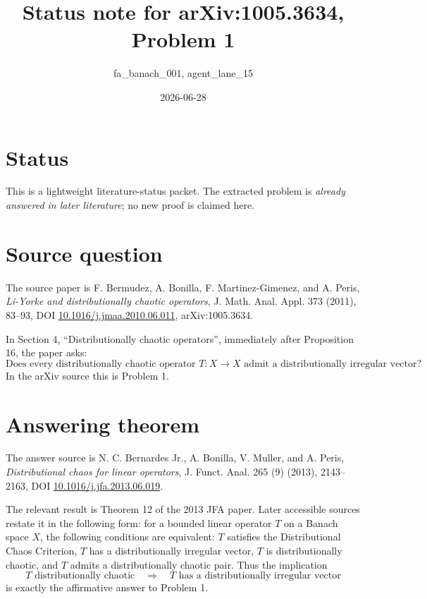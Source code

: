 \documentclass[11pt]{article}
\title{Status note for arXiv:1005.3634, Problem 1}
\author{fa\_banach\_001, agent\_lane\_15}
\date{2026-06-28}
\begin{document}
\maketitle

\section*{Status}

This is a lightweight literature-status packet.  The extracted problem is
\emph{already answered in later literature}; no new proof is claimed here.

\section*{Source question}

The source paper is F. Bermudez, A. Bonilla, F. Martinez-Gimenez, and A. Peris,
\emph{Li-Yorke and distributionally chaotic operators}, J. Math. Anal. Appl.
373 (2011), 83--93, DOI
\href{https://doi.org/10.1016/j.jmaa.2010.06.011}{10.1016/j.jmaa.2010.06.011},
arXiv:1005.3634.

In Section 4, ``Distributionally chaotic operators'', immediately after
Proposition 16, the paper asks:
\[
\text{Does every distributionally chaotic operator } T:X\to X
\text{ admit a distributionally irregular vector?}
\]
In the arXiv source this is Problem 1.

\section*{Answering theorem}

The answer source is N. C. Bernardes Jr., A. Bonilla, V. Muller, and A. Peris,
\emph{Distributional chaos for linear operators}, J. Funct. Anal. 265 (9)
(2013), 2143--2163, DOI
\href{https://doi.org/10.1016/j.jfa.2013.06.019}{10.1016/j.jfa.2013.06.019}.

The relevant result is Theorem 12 of the 2013 JFA paper.  Later accessible
sources restate it in the following form: for a bounded linear operator
\(T\) on a Banach space \(X\), the following conditions are equivalent:
\(T\) satisfies the Distributional Chaos Criterion, \(T\) has a
distributionally irregular vector, \(T\) is distributionally chaotic, and
\(T\) admits a distributionally chaotic pair.  Thus the implication
\[
T \text{ distributionally chaotic}
\quad\Longrightarrow\quad
T \text{ has a distributionally irregular vector}
\]
is exactly the affirmative answer to Problem 1.
\end{document}
